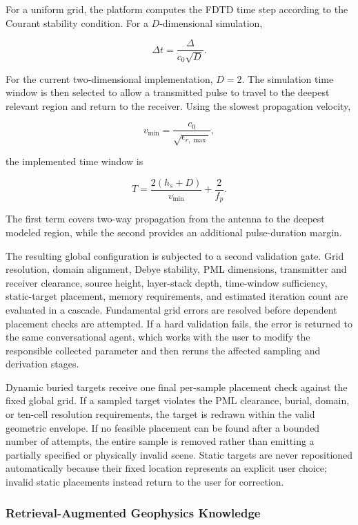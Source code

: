 \documentclass[journal]{IEEEtran}
\begin{document}
For a uniform grid, the platform computes the FDTD time step according to the Courant stability condition. For a \(D\)-dimensional simulation,

$$
\Delta t
=
\frac{\Delta}
{c_0\sqrt{D}}.
$$

For the current two-dimensional implementation, \(D=2\). The simulation time window is then selected to allow a transmitted pulse to travel to the deepest relevant region and return to the receiver. Using the slowest propagation velocity,

$$
v_{\min}
=
\frac{c_0}
{\sqrt{\epsilon_{r,\max}}},
$$

the implemented time window is

$$
T =
\frac{2(h_s+D)}{v_{\min}}
+
\frac{2}{f_p}.
$$

The first term covers two-way propagation from the antenna to the deepest modeled region, while the second provides an additional pulse-duration margin.

The resulting global configuration is subjected to a second validation gate. Grid resolution, domain alignment, Debye stability, PML dimensions, transmitter and receiver clearance, source height, layer-stack depth, time-window sufficiency, static-target placement, memory requirements, and estimated iteration count are evaluated in a cascade. Fundamental grid errors are resolved before dependent placement checks are attempted. If a hard validation fails, the error is returned to the same conversational agent, which works with the user to modify the responsible collected parameter and then reruns the affected sampling and derivation stages.

Dynamic buried targets receive one final per-sample placement check against the fixed global grid. If a sampled target violates the PML clearance, burial, domain, or ten-cell resolution requirements, the target is redrawn within the valid geometric envelope. If no feasible placement can be found after a bounded number of attempts, the entire sample is removed rather than emitting a partially specified or physically invalid scene. Static targets are never repositioned automatically because their fixed location represents an explicit user choice; invalid static placements instead return to the user for correction.

\subsubsection{Retrieval-Augmented Geophysics Knowledge}
\end{document}
